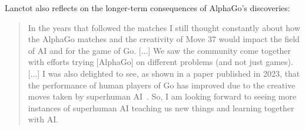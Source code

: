 Lanctot also reflects on the longer-term consequences of AlphaGo's discoveries:

\begin{quote}

    In the years that followed the matches I still thought constantly about how the AlphaGo matches and the creativity of Move 37 would impact the field of AI and for the game of Go. [...]
    We saw the community come together with efforts 
    trying [AlphaGo] on different problems (and not just games). [...]
    I was also delighted to see, as shown in a paper published in 2023, that the performance of human players of Go has improved due to the creative moves taken by superhuman AI~\citep{Shin2023Go}. 
    So, I am looking forward to seeing more instances of superhuman AI teaching us new things and learning together with AI.
\end{quote}
